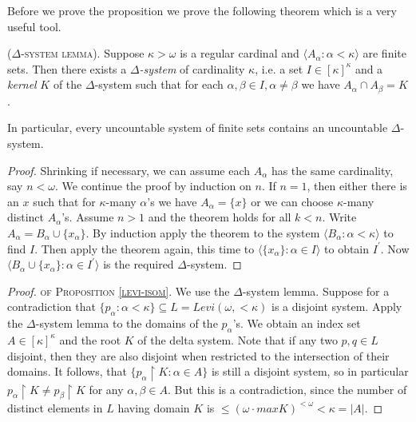 Before we prove the proposition we prove the following theorem which is a very useful tool.

\begin{theorem}\label{delta-system-lemma}
{\scshape ({$\Delta$-system lemma}). } Suppose $\kappa>\omega$ is a regular cardinal and $\langle A_\alpha:\alpha<\kappa\rangle$ are finite sets.
Then there exists a \emph{$\Delta$-system} of cardinality $\kappa$, i.e. a set $I\in[\kappa]^\kappa$ and a \emph{kernel} $K$ of the $\Delta$-system such that for each $\alpha,\beta\in I,\alpha\neq\beta$ we have
$A_\alpha\cap A_\beta=K$.

\smallskip

In particular, every uncountable system of finite sets contains an uncountable $\Delta$-system.
\end{theorem}

\begin{proof}
Shrinking if necessary, we can assume each $A_\alpha$ has the same cardinality,
say $n<\omega$. We continue the proof by induction on $n$.
 If $n=1$, then either there is an $x$ such that for $\kappa$-many $\alpha$'s we
have $A_\alpha=\{x\}$ or we can choose $\kappa$-many
distinct $A_\alpha$'s. Assume $n>1$ and the theorem holds for all $k<n$.
Write $A_\alpha=B_\alpha\cup\{x_\alpha\}$. By induction apply the theorem to the system
$\langle B_\alpha:\alpha<\kappa\rangle$ to find $I$.
Then apply the theorem again, this time to $\langle \{x_\alpha\}:\alpha\in I\rangle$ to obtain $I^\prime$. Now
$\langle B_\alpha\cup\{x_\alpha\}:\alpha\in I^\prime\rangle$ is the required $\Delta$-system.
\end{proof}

\begin{proof} {\scshape of Proposition \ref{levi-isom}.}
We use the $\Delta$-system lemma. Suppose for a contradiction that $\{p_\alpha:\alpha<\kappa\}\subseteq L=Levi(\omega,<\!\!\kappa)$ is a disjoint system. Apply the $\Delta$-system
lemma to the domains of the $p_\alpha$'s. We obtain an index set $A\in[\kappa]^\kappa$ and the root $K$ of the delta system. Note that if any two $p,q\in L$ disjoint, then
they are also disjoint when restricted to the intersection of their domains. It follows,
that $\{p_\alpha\upharpoonright K:\alpha\in A\}$ is still a disjoint system, so in particular $p_\alpha\upharpoonright K\neq p_\beta\upharpoonright K$ for any $\alpha,\beta\in A$. But this is a contradiction, since the number of distinct elements in $L$ having domain $K$ is $\leq (\omega\cdot max K)^{<\omega}<\kappa=|A|$.
\end{proof}



